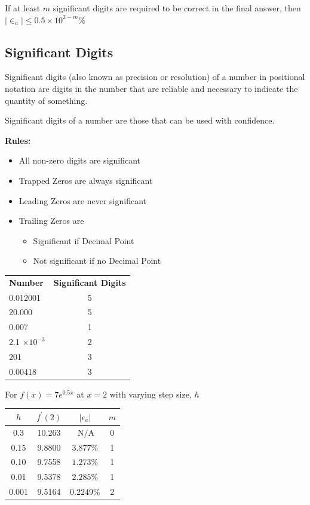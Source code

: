 If at least $m$ significant digits are required to be correct in the final answer, then $|\in_a| \leq 0.5 \times 10^{2-m}\%$


\vspace{2ex}
\subsection{Significant Digits}
Significant digits (also known as precision or resolution) of a number in positional notation are digits in the number that are reliable and necessary to indicate the quantity of something.

Significant digits of a number are those that can be used with confidence.

\vspace{2ex}
\begin{minipage}{0.48\textwidth}
\textbf{Rules:}
\begin{itemize}[parsep=4pt]
   \item All non-zero digits are significant
   \item Trapped Zeros are always significant
   \item Leading Zeros are never significant
   \item Trailing Zeros are
   \begin{itemize}
      \item Significant if Decimal Point
      \item Not significant if no Decimal Point
   \end{itemize}
\end{itemize}
\end{minipage}
\begin{minipage}{0.48\textwidth}
   \begin{tabularx}{\textwidth}{p{4cm}c}
      \textbf{Number} & \textbf{Significant Digits} \\
      0.012001 & 5 \\
      20.000 & 5 \\
      0.007 & 1 \\
      2.1 $\times \text{10}^{-\text{3}}$ & 2 \\
      201 & 3 \\
      0.00418 & 3
   \end{tabularx}
\end{minipage}

\vspace{2ex}
For $f(x)=7 e^{0.5 x}$ at $x=2$ with varying step size, $h$

\begin{tabular}{|c|c|c|c|}
\hline$h$ & $f^{\prime}(2)$ & $\left|\epsilon_a\right|$ & $m$ \\
\hline 0.3 & 10.263 & $\mathrm{~N} / \mathrm{A}$ & 0 \\
\hline 0.15 & 9.8800 & $3.877 \%$ & 1 \\
\hline 0.10 & 9.7558 & $1.273 \%$ & 1 \\
\hline 0.01 & 9.5378 & $2.285 \%$ & 1 \\
\hline 0.001 & 9.5164 & $0.2249 \%$ & 2 \\
\hline
\end{tabular}